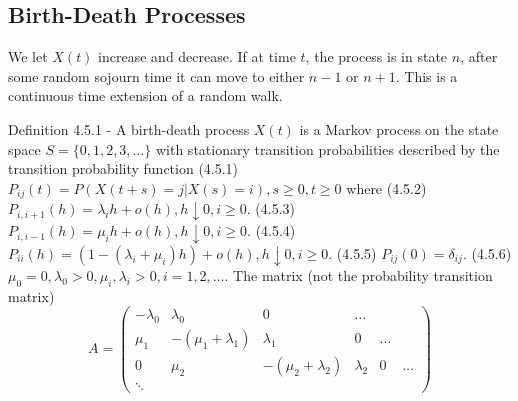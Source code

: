 \documentclass{article}
\begin{document}
\subsection{Birth-Death Processes}

We let $X(t)$ increase and decrease. If at time $t$, the process is in state $n$, after some random sojourn time it can move to either $n-1$ or $n+1$. This is a continuous time extension of a random walk.

Definition 4.5.1 - A birth-death process $X(t)$ is a Markov process on the state space $S = \{0, 1, 2, 3, \dots\}$ with stationary transition probabilities described by the transition probability function (4.5.1) $P_{ij}(t) = P(X(t+s)=j|X(s)=i), s \ge 0, t \ge 0$ where (4.5.2) $P_{i, i+1}(h) = \lambda_i h + o(h), h \downarrow 0, i \ge 0$. (4.5.3) $P_{i, i-1}(h) = \mu_i h + o(h), h \downarrow 0, i \ge 0$. (4.5.4) $P_{ii}(h) = (1-(\lambda_i + \mu_i)h) + o(h), h \downarrow 0, i \ge 0$. (4.5.5) $P_{ij}(0) = \delta_{ij}$. (4.5.6) $\mu_0 = 0, \lambda_0 > 0, \mu_i, \lambda_i > 0, i = 1, 2, \dots$. The matrix (not the probability transition matrix) \begin{displaymath} A = \left( \begin{array}{llllllll} -\lambda_0 & \lambda_0 & 0 & \dots \\ \mu_1 & -(\mu_1 + \lambda_1) & \lambda_1 & 0 & \dots \\ 0 & \mu_2 & -(\mu_2 + \lambda_2) & \lambda_2 & 0 & \dots \\ \ddots \end{array} \right) \end{displaymath}
\end{document}
